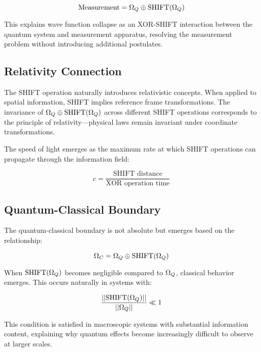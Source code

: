 \begin{equation}
\text{Measurement} = \Omega_Q \oplus \text{SHIFT}(\Omega_Q)
\end{equation}

This explains wave function collapse as an XOR-SHIFT interaction between the quantum system and measurement apparatus, resolving the measurement problem without introducing additional postulates.

\subsection{Relativity Connection}

The SHIFT operation naturally introduces relativistic concepts. When applied to spatial information, SHIFT implies reference frame transformations. The invariance of $\Omega_Q \oplus \text{SHIFT}(\Omega_Q)$ across different SHIFT operations corresponds to the principle of relativity—physical laws remain invariant under coordinate transformations.

The speed of light emerges as the maximum rate at which SHIFT operations can propagate through the information field:

\begin{equation}
c = \frac{\text{SHIFT distance}}{\text{XOR operation time}}
\end{equation}

\subsection{Quantum-Classical Boundary}

The quantum-classical boundary is not absolute but emerges based on the relationship:

\begin{equation}
\Omega_C = \Omega_Q \oplus \text{SHIFT}(\Omega_Q)
\end{equation}

When $\text{SHIFT}(\Omega_Q)$ becomes negligible compared to $\Omega_Q$, classical behavior emerges. This occurs naturally in systems with:

\begin{equation}
\frac{||\text{SHIFT}(\Omega_Q)||}{||\Omega_Q||} \ll 1
\end{equation}

This condition is satisfied in macroscopic systems with substantial information content, explaining why quantum effects become increasingly difficult to observe at larger scales.

